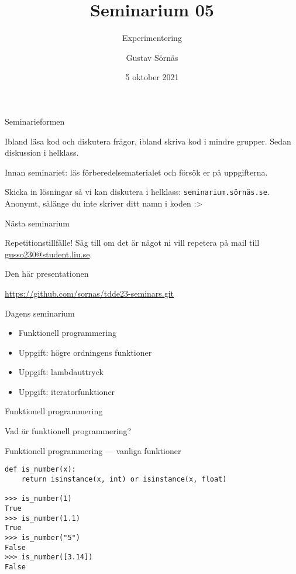 \documentclass{beamer}
\title{Seminarium 05}
\subtitle{Experimentering}
\date{5 oktober 2021}
\author{Gustav Sörnäs}
\begin{document}
  \frame{\titlepage}

  \begin{frame}{Seminarieformen}

    Ibland läsa kod och diskutera frågor, ibland skriva kod i mindre grupper.
    Sedan diskussion i helklass.

    Innan seminariet: läs förberedelsematerialet och försök er på uppgifterna.

    Skicka in lösningar så vi kan diskutera i helklass:
    \texttt{seminarium.sörnäs.se}. Anonymt, sålänge du inte skriver ditt namn i
    koden :>

  \end{frame}

  \begin{frame}{Nästa seminarium}

    Repetitionstillfälle! Säg till om det är något ni vill repetera på mail
    till \url{gusso230@student.liu.se}.

  \end{frame}

  \begin{frame}{Den här presentationen}

    \url{https://github.com/sornas/tdde23-seminars.git}

  \end{frame}

  \begin{frame}{Dagens seminarium}

    \begin{itemize}
      \item Funktionell programmering
      \item Uppgift: högre ordningens funktioner
      \item Uppgift: lambdauttryck
      \item Uppgift: iteratorfunktioner
    \end{itemize}

  \end{frame}

  \begin{frame}{Funktionell programmering}

    Vad är funktionell programmering?

  \end{frame}

  \begin{frame}[fragile]{Funktionell programmering --- vanliga funktioner}

    \begin{lstlisting}
def is_number(x):
    return isinstance(x, int) or isinstance(x, float)

>>> is_number(1)
True
>>> is_number(1.1)
True
>>> is_number("5")
False
>>> is_number([3.14])
False
    \end{lstlisting}

  \end{frame}
\end{document}
